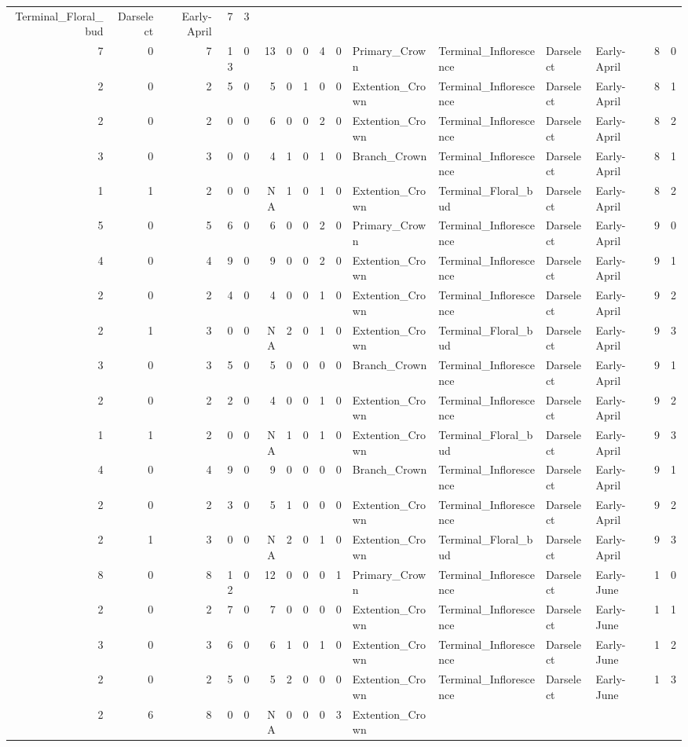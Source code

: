 \documentclass[]{article}
\begin{document}
\begin{longtable}[]{@{}rrrrrrrrrrllllrl@{}}
Terminal\_Floral\_bud & Darselect & Early-April & 7 & 3\tabularnewline
7 & 0 & 7 & 13 & 0 & 13 & 0 & 0 & 4 & 0 & Primary\_Crown &
Terminal\_Inflorescence & Darselect & Early-April & 8 & 0\tabularnewline
2 & 0 & 2 & 5 & 0 & 5 & 0 & 1 & 0 & 0 & Extention\_Crown &
Terminal\_Inflorescence & Darselect & Early-April & 8 & 1\tabularnewline
2 & 0 & 2 & 0 & 0 & 6 & 0 & 0 & 2 & 0 & Extention\_Crown &
Terminal\_Inflorescence & Darselect & Early-April & 8 & 2\tabularnewline
3 & 0 & 3 & 0 & 0 & 4 & 1 & 0 & 1 & 0 & Branch\_Crown &
Terminal\_Inflorescence & Darselect & Early-April & 8 & 1\tabularnewline
1 & 1 & 2 & 0 & 0 & NA & 1 & 0 & 1 & 0 & Extention\_Crown &
Terminal\_Floral\_bud & Darselect & Early-April & 8 & 2\tabularnewline
5 & 0 & 5 & 6 & 0 & 6 & 0 & 0 & 2 & 0 & Primary\_Crown &
Terminal\_Inflorescence & Darselect & Early-April & 9 & 0\tabularnewline
4 & 0 & 4 & 9 & 0 & 9 & 0 & 0 & 2 & 0 & Extention\_Crown &
Terminal\_Inflorescence & Darselect & Early-April & 9 & 1\tabularnewline
2 & 0 & 2 & 4 & 0 & 4 & 0 & 0 & 1 & 0 & Extention\_Crown &
Terminal\_Inflorescence & Darselect & Early-April & 9 & 2\tabularnewline
2 & 1 & 3 & 0 & 0 & NA & 2 & 0 & 1 & 0 & Extention\_Crown &
Terminal\_Floral\_bud & Darselect & Early-April & 9 & 3\tabularnewline
3 & 0 & 3 & 5 & 0 & 5 & 0 & 0 & 0 & 0 & Branch\_Crown &
Terminal\_Inflorescence & Darselect & Early-April & 9 & 1\tabularnewline
2 & 0 & 2 & 2 & 0 & 4 & 0 & 0 & 1 & 0 & Extention\_Crown &
Terminal\_Inflorescence & Darselect & Early-April & 9 & 2\tabularnewline
1 & 1 & 2 & 0 & 0 & NA & 1 & 0 & 1 & 0 & Extention\_Crown &
Terminal\_Floral\_bud & Darselect & Early-April & 9 & 3\tabularnewline
4 & 0 & 4 & 9 & 0 & 9 & 0 & 0 & 0 & 0 & Branch\_Crown &
Terminal\_Inflorescence & Darselect & Early-April & 9 & 1\tabularnewline
2 & 0 & 2 & 3 & 0 & 5 & 1 & 0 & 0 & 0 & Extention\_Crown &
Terminal\_Inflorescence & Darselect & Early-April & 9 & 2\tabularnewline
2 & 1 & 3 & 0 & 0 & NA & 2 & 0 & 1 & 0 & Extention\_Crown &
Terminal\_Floral\_bud & Darselect & Early-April & 9 & 3\tabularnewline
8 & 0 & 8 & 12 & 0 & 12 & 0 & 0 & 0 & 1 & Primary\_Crown &
Terminal\_Inflorescence & Darselect & Early-June & 1 & 0\tabularnewline
2 & 0 & 2 & 7 & 0 & 7 & 0 & 0 & 0 & 0 & Extention\_Crown &
Terminal\_Inflorescence & Darselect & Early-June & 1 & 1\tabularnewline
3 & 0 & 3 & 6 & 0 & 6 & 1 & 0 & 1 & 0 & Extention\_Crown &
Terminal\_Inflorescence & Darselect & Early-June & 1 & 2\tabularnewline
2 & 0 & 2 & 5 & 0 & 5 & 2 & 0 & 0 & 0 & Extention\_Crown &
Terminal\_Inflorescence & Darselect & Early-June & 1 & 3\tabularnewline
2 & 6 & 8 & 0 & 0 & NA & 0 & 0 & 0 & 3 & Extention\_Crown &

\end{longtable}
\end{document}
